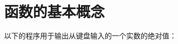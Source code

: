 
\section{函数的基本概念}

以下的程序用于输出从键盘输入的一个实数的绝对值：

\framebox[\textwidth]{

}


\framebox[\textwidth]{

}
